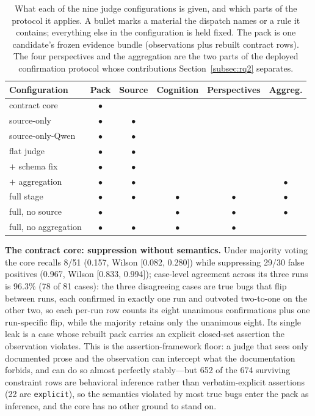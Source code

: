 \documentclass[acmsmall,screen,review,anonymous]{acmart}
\begin{document}
\begin{table}[t]
\caption{What each of the nine judge configurations is given, and which parts of the protocol it applies. A bullet marks a material the dispatch names or a rule it contains; everything else in the configuration is held fixed. The pack is one candidate's frozen evidence bundle (observations plus rebuilt contract rows). The four perspectives and the aggregation are the two parts of the deployed confirmation protocol whose contributions Section~\ref{subsec:rq2} separates.}
\label{tab:rq2-access}
\small
\begin{tabular}{@{}lccccc@{}}
\toprule
Configuration & Pack & Source & Cognition & Perspectives & Aggreg. \\
\midrule
contract core & $\bullet$ & & & & \\
source-only & $\bullet$ & $\bullet$ & & & \\
source-only-Qwen & $\bullet$ & $\bullet$ & & & \\
flat judge & $\bullet$ & $\bullet$ & & & \\
\quad $+$ schema fix & $\bullet$ & $\bullet$ & & & \\
\quad $+$ aggregation & $\bullet$ & $\bullet$ & & & $\bullet$ \\
full stage & $\bullet$ & $\bullet$ & $\bullet$ & $\bullet$ & $\bullet$ \\
full, no source & $\bullet$ & & $\bullet$ & $\bullet$ & $\bullet$ \\
full, no aggregation & $\bullet$ & $\bullet$ & $\bullet$ & $\bullet$ & \\
\bottomrule
\end{tabular}
\end{table}

\textbf{The contract core: suppression without semantics.}
Under majority voting the core recalls 8/51 (0.157, Wilson [0.082, 0.280]) while suppressing 29/30 false positives (0.967, Wilson [0.833, 0.994]); case-level agreement across its three runs is 96.3\% (78 of 81 cases): the three disagreeing cases are true bugs that flip between runs, each confirmed in exactly one run and outvoted two-to-one on the other two, so each per-run row counts its eight unanimous confirmations plus one run-specific flip, while the majority retains only the unanimous eight. Its single leak is a case whose rebuilt pack carries an explicit closed-set assertion the observation violates. This is the assertion-framework floor: a judge that sees only documented prose and the observation can intercept what the documentation forbids, and can do so almost perfectly stably---but 652 of the 674 surviving constraint rows are behavioral inference rather than verbatim-explicit assertions (22 are \texttt{explicit}), so the semantics violated by most true bugs enter the pack as inference, and the core has no other ground to stand on.
\end{document}
